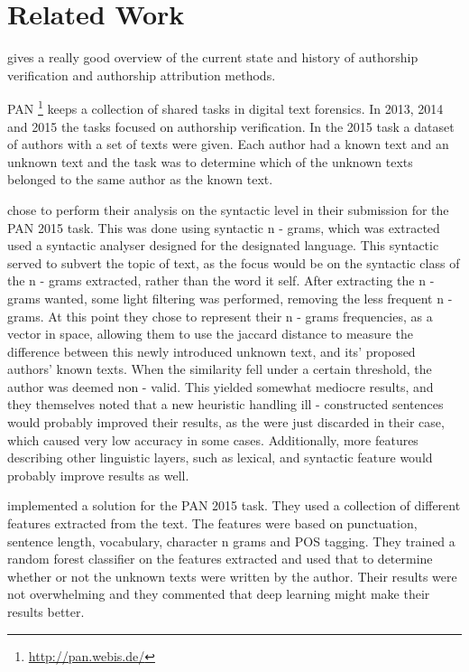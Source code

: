 \section{Related Work}
\cite{stamatos2009} gives a really good overview of the current state and
history of authorship verification and authorship attribution methods.

PAN \footnote{\url{http://pan.webis.de/}} keeps a collection of shared tasks in
digital text forensics. In 2013, 2014 and 2015 the tasks focused on authorship
verification. In the 2015 task a dataset of authors with a set of texts were
given. Each author had a known text and an unknown text and the task was to
determine which of the unknown texts belonged to the same author as the known
text.

\cite{juanpablo2015} chose to perform their analysis on the syntactic level in
their submission for the PAN 2015 task. This was done using syntactic n - grams,
which was extracted used a syntactic analyser designed for the designated
language. This syntactic served to subvert the topic of text, as the focus
would be on the syntactic class of the n - grams extracted, rather than the word
it self.
After extracting the n - grams wanted, some light filtering was performed,
removing the less frequent n - grams. At this point they chose to represent 
their
n - grams frequencies, as a vector in space, allowing them to use the jaccard
distance to measure the difference between this newly introduced unknown text,
and its' proposed authors' known texts. When the similarity fell under a
certain threshold, the author was deemed non - valid.
This yielded somewhat mediocre results, and they themselves noted that a new
heuristic handling ill - constructed sentences would probably improved their
results, as the were just discarded in their case, which caused very low
accuracy in some cases. Additionally, more features describing other linguistic
layers, such as lexical, and syntactic feature would probably improve results
as well.

\cite{maitra2015} implemented a solution for the PAN 2015 task. They used a
collection of different features extracted from the text. The features were
based on punctuation, sentence length, vocabulary, character n grams and
\gls{POS} tagging. They trained a random forest classifier on the features
extracted and used that to determine whether or not the unknown texts were
written by the author. Their results were not overwhelming and they commented
that deep learning might make their results better.

